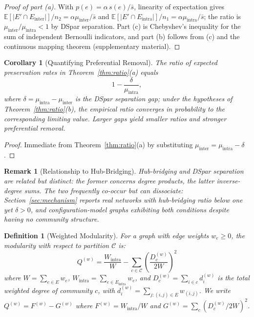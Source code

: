 \documentclass[10pt,journal,compsoc]{IEEEtran}
\newtheorem{corollary}{Corollary}
\newtheorem{definition}{Definition}
\newtheorem{remark}{Remark}
\begin{document}
\begin{proof}[Proof of part (a)]
With $p(e) = \alpha\, s(e)/\bar{s}$, linearity of expectation gives $\mathbb{E}[|E' \cap E_{\text{inter}}|]/n_2 = \alpha \mu_{\text{inter}}/\bar{s}$ and $\mathbb{E}[|E' \cap E_{\text{intra}}|]/n_1 = \alpha \mu_{\text{intra}}/\bar{s}$; the ratio is $\mu_{\text{inter}}/\mu_{\text{intra}} < 1$ by DSpar separation. Part (c) is Chebyshev's inequality for the sum of independent Bernoulli indicators, and part (b) follows from (c) and the continuous mapping theorem (supplementary material).
\end{proof}

\begin{corollary}[Quantifying Preferential Removal]
The ratio of expected preservation rates in Theorem~\ref{thm:ratio}(a) equals
\begin{equation}
1 - \frac{\delta}{\mu_{\text{intra}}},
\end{equation}
where $\delta = \mu_{\text{intra}} - \mu_{\text{inter}}$ is the DSpar separation gap; under the hypotheses of Theorem~\ref{thm:ratio}(b), the empirical ratio converges in probability to the corresponding limiting value. Larger gaps yield smaller ratios and stronger preferential removal.
\end{corollary}

\begin{proof}
Immediate from Theorem~\ref{thm:ratio}(a) by substituting $\mu_{\text{inter}} = \mu_{\text{intra}} - \delta$.
\end{proof}

\begin{remark}[Relationship to Hub-Bridging]
Hub-bridging and DSpar separation are related but distinct: the former concerns degree products, the latter inverse-degree sums. The two frequently co-occur but can dissociate: Section~\ref{sec:mechanism} reports real networks with hub-bridging ratio below one yet $\delta > 0$, and configuration-model graphs exhibiting both conditions despite having no community structure.
\end{remark}

\begin{definition}[Weighted Modularity]
For a graph with edge weights $w_e \geq 0$, the modularity with respect to partition $\mathcal{C}$ is:
\begin{equation}
Q^{(w)} = \frac{W_{\text{intra}}}{W} - \sum_{c \in \mathcal{C}} \left( \frac{D_c^{(w)}}{2W} \right)^2
\end{equation}
where $W = \sum_{e \in E} w_e$, $W_{\text{intra}} = \sum_{e \in E_{\text{intra}}} w_e$, and $D_c^{(w)} = \sum_{i \in c} d_i^{(w)}$ is the total weighted degree of community $c$, with $d_i^{(w)} = \sum_{j: (i,j) \in E} w_{(i,j)}$.
We write $Q^{(w)} = F^{(w)} - G^{(w)}$ where $F^{(w)} = W_{\text{intra}}/W$ and $G^{(w)} = \sum_c (D_c^{(w)}/2W)^2$.
\end{definition}
\end{document}
